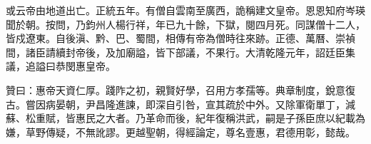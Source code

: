 \begin{pinyinscope}
或云帝由地道出亡。正統五年。有僧自雲南至廣西，詭稱建文皇帝。恩恩知府岑瑛聞於朝。按問，乃鈞州人楊行祥，年已九十餘，下獄，閱四月死。同謀僧十二人，皆戍遼東。自後滇、黔、巴、蜀間，相傳有帝為僧時往來跡。正德、萬曆、崇禎間，諸臣請續封帝後，及加廟謚，皆下部議，不果行。大清乾隆元年，詔廷臣集議，追謚曰恭閔惠皇帝。

贊曰：惠帝天資仁厚。踐阼之初，親賢好學，召用方孝孺等。典章制度，銳意復古。嘗因病晏朝，尹昌隆進諫，即深自引咎，宣其疏於中外。又除軍衛單丁，減蘇、松重賦，皆惠民之大者。乃革命而後，紀年復稱洪武，嗣是子孫臣庶以紀載為嫌，草野傳疑，不無訛謬。更越聖朝，得經論定，尊名壹惠，君德用彰，懿哉。


\end{pinyinscope}